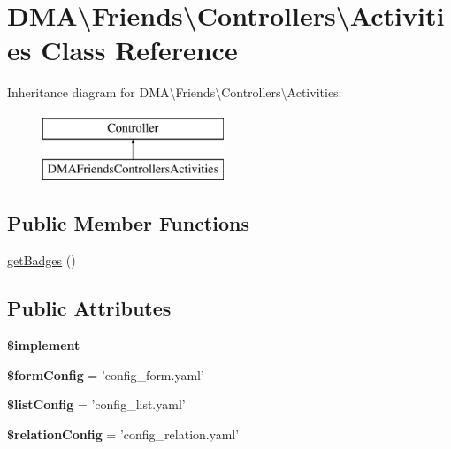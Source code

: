 \hypertarget{classDMA_1_1Friends_1_1Controllers_1_1Activities}{\section{D\-M\-A\textbackslash{}Friends\textbackslash{}Controllers\textbackslash{}Activities Class Reference}
\label{classDMA_1_1Friends_1_1Controllers_1_1Activities}
}
Inheritance diagram for D\-M\-A\textbackslash{}Friends\textbackslash{}Controllers\textbackslash{}Activities\-:\begin{figure}[H]
\begin{center}
\leavevmode
\includegraphics[height=2.000000cm]{d4/d37/classDMA_1_1Friends_1_1Controllers_1_1Activities}
\end{center}
\end{figure}
\subsection*{Public Member Functions}
\begin{DoxyCompactItemize}
\item 
\hyperlink{classDMA_1_1Friends_1_1Controllers_1_1Activities_a948fafcbcdac79c1851667216cee1e66}{get\-Badges} ()
\end{DoxyCompactItemize}
\subsection*{Public Attributes}
\begin{DoxyCompactItemize}
\item 
{\bfseries \$implement}
\item 
\hypertarget{classDMA_1_1Friends_1_1Controllers_1_1Activities_a05bd364a981c519d8288a80a0bf816d7}{{\bfseries \$form\-Config} = 'config\-\_\-form.\-yaml'}\label{classDMA_1_1Friends_1_1Controllers_1_1Activities_a05bd364a981c519d8288a80a0bf816d7}

\item 
\hypertarget{classDMA_1_1Friends_1_1Controllers_1_1Activities_ac9c246da820ff83a1c0ffe831421d26f}{{\bfseries \$list\-Config} = 'config\-\_\-list.\-yaml'}\label{classDMA_1_1Friends_1_1Controllers_1_1Activities_ac9c246da820ff83a1c0ffe831421d26f}

\item 
\hypertarget{classDMA_1_1Friends_1_1Controllers_1_1Activities_a816d7d22813eaf0145186ec3ea447bf0}{{\bfseries \$relation\-Config} = 'config\-\_\-relation.\-yaml'}\label{classDMA_1_1Friends_1_1Controllers_1_1Activities_a816d7d22813eaf0145186ec3ea447bf0}

\end{DoxyCompactItemize}


